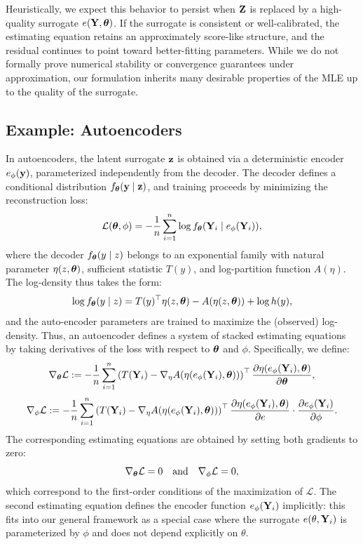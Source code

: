 \documentclass[twoside,11pt]{article}
\begin{document}
Heuristically, we expect this behavior to persist when \( {\bf Z} \) is replaced by a high-quality surrogate \( e({\bf Y}, {\bm{\theta}}) \). If the surrogate is consistent or well-calibrated, the estimating equation retains an approximately score-like structure, and the residual continues to point toward better-fitting parameters. While we do not formally prove numerical stability or convergence guarantees under approximation, our formulation inherits many desirable properties of the MLE up to the quality of the surrogate.

\subsection{Example: Autoencoders}

In autoencoders, the latent surrogate \( {\bf z} \) is obtained via a deterministic encoder \( e_\phi({\bf y}) \), parameterized independently from the decoder. The decoder defines a conditional distribution \( f_{\bm{\theta}}({\bf y} \mid {\bf z}) \), and training proceeds by minimizing the reconstruction loss:
\[
\mathcal{L}({\bm{\theta}}, \phi) = -\frac{1}{n} \sum_{i=1}^n \log f_{\bm{\theta}}({\bf Y}_i \mid e_\phi({\bf Y}_i)),
\]
where the decoder \( f_{\bm{\theta}}(y \mid z) \) belongs to an exponential family with natural parameter \( \eta(z, {\bm{\theta}}) \), sufficient statistic \( T(y) \), and log-partition function \( A(\eta) \). The log-density thus takes the form:
\[
\log f_{\bm{\theta}}(y \mid z) = T(y)^\top \eta(z, {\bm{\theta}}) - A(\eta(z, {\bm{\theta}})) + \log h(y),
\]
and the auto-encoder parameters are trained to maximize the (observed) log-density. Thus, an autoencoder defines a system of stacked estimating equations by taking derivatives of the loss with respect to \( {\bm{\theta}} \) and \( \phi \). Specifically, we define:
\[
\nabla_{\bm{\theta}} \mathcal{L} := -\frac{1}{n} \sum_{i=1}^n 
\left( T({\bf Y}_i) - \nabla_\eta A(\eta(e_\phi({\bf Y}_i), {\bm{\theta}})) \right)^\top 
\frac{\partial \eta(e_\phi({\bf Y}_i), {\bm{\theta}})}{\partial {\bm{\theta}}},
\]
\[
\nabla_\phi \mathcal{L} := -\frac{1}{n} \sum_{i=1}^n 
\left( T({\bf Y}_i) - \nabla_\eta A(\eta(e_\phi({\bf Y}_i), {\bm{\theta}})) \right)^\top 
\frac{\partial \eta(e_\phi({\bf Y}_i), {\bm{\theta}})}{\partial e} \cdot 
\frac{\partial e_\phi({\bf Y}_i)}{\partial \phi}.
\]
The corresponding estimating equations are obtained by setting both gradients to zero:
\[
\nabla_{\bm{\theta}} \mathcal{L} = 0 \quad \text{and} \quad \nabla_\phi \mathcal{L} = 0,
\]
which correspond to the first-order conditions of the maximization of $\mathcal L$. The second estimating equation defines the encoder function \( e_\phi({\bf Y}_i) \) implicitly: this fits into our general framework as a special case where the surrogate \( e(\theta, {\bf Y}_i) \) is parameterized by \( \phi \) and does not depend explicitly on \( \theta \).
\end{document}
